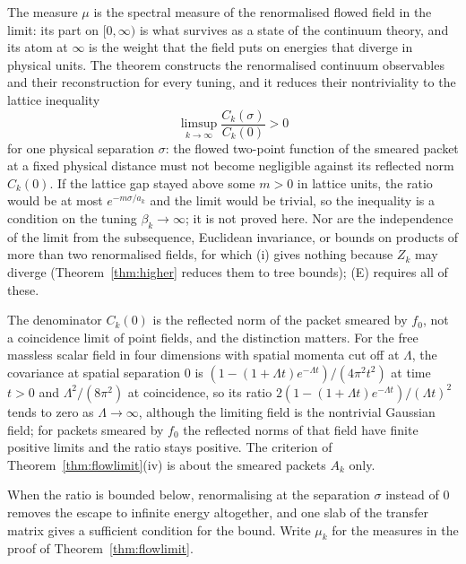 \documentclass[11pt]{amsart}
\theoremstyle{definition}
\theoremstyle{remark}
\numberwithin{equation}{section}
\begin{document}
The measure $\mu$ is the spectral measure of the renormalised flowed field in
the limit: its part on $[0,\infty)$ is what survives as a state of the
continuum theory, and its atom at $\infty$ is the weight that the field puts on
energies that diverge in physical units. The theorem constructs the
renormalised continuum observables and their reconstruction for every tuning,
and it reduces their nontriviality to the lattice inequality
\[
\limsup_{k\to\infty}\frac{C_k(\sigma)}{C_k(0)}>0
\]
for one physical separation $\sigma$: the flowed two-point function of the
smeared packet at a fixed physical distance must not become negligible
against its reflected norm $C_k(0)$. If the lattice gap stayed above some $m>0$ in lattice units, the
ratio would be at most $e^{-m\sigma/a_k}$ and the limit would be trivial, so the
inequality is a condition on the tuning $\beta_k\to\infty$; it is not proved
here. Nor are the independence of the limit from the subsequence, Euclidean
invariance, or bounds on products of more than two renormalised fields, for
which (i) gives nothing because $Z_k$ may diverge (Theorem~\ref{thm:higher}
reduces them to tree bounds); (E) requires all of these.

The denominator $C_k(0)$ is the reflected norm of the packet smeared by
$f_0$, not a coincidence limit of point fields, and the distinction matters.
For the free massless scalar field in four dimensions with spatial momenta cut
off at $\Lambda$, the covariance at spatial separation $0$ is
$(1-(1+\Lambda t)e^{-\Lambda t})/(4\pi^2t^2)$ at time $t>0$ and
$\Lambda^2/(8\pi^2)$ at coincidence, so its ratio
$2(1-(1+\Lambda t)e^{-\Lambda t})/(\Lambda t)^2$ tends to zero as
$\Lambda\to\infty$, although the limiting field is the nontrivial Gaussian
field; for packets smeared by $f_0$ the reflected norms of that field have
finite positive limits and the ratio stays positive. The criterion of
Theorem~\ref{thm:flowlimit}(iv) is about the smeared packets $A_k$ only.

When the ratio is bounded below, renormalising at the separation $\sigma$
instead of $0$ removes the escape to infinite energy altogether, and one slab
of the transfer matrix gives a sufficient condition for the bound. Write
$\mu_k$ for the measures in the proof of Theorem~\ref{thm:flowlimit}.
\end{document}
